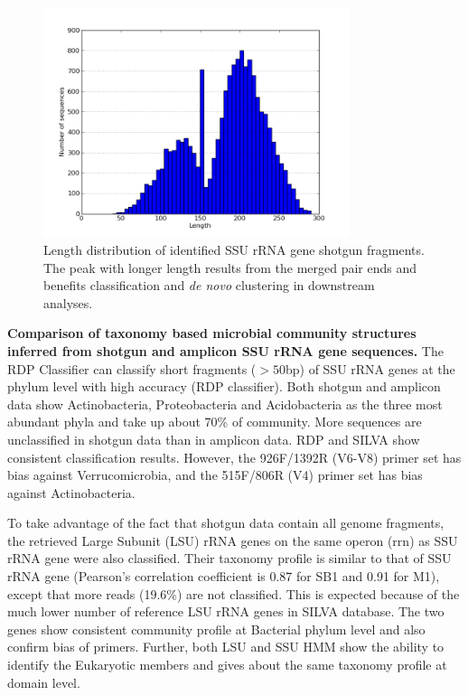 \documentclass[12pt]{article}
\begin{document}
    \begin{figure}[tbph!]
    \centering
    \includegraphics[width=0.8\textwidth]{figs/read_length_dist.png}

    \caption[Length distribution of identified SSU rRNA gene shotgun
    fragments]{Length distribution of identified SSU rRNA gene shotgun
    fragments. The peak with longer length results from the merged
    pair ends and benefits classification and {\em de novo} clustering
    in downstream analyses.}

    \label{fig:read_length_dist}
    \end{figure}

{\bf Comparison of taxonomy based microbial community structures
inferred from shotgun and amplicon SSU rRNA gene sequences. } The RDP
Classifier can classify short fragments ($>50$bp) of SSU rRNA genes at
the phylum level with high accuracy (RDP classifier). Both shotgun and
amplicon data show Actinobacteria, Proteobacteria and Acidobacteria as
the three most abundant phyla and take up about 70\% of
community. More sequences are unclassified in shotgun data than in
amplicon data. RDP and SILVA show consistent classification
results. However, the 926F/1392R (V6-V8) primer set has bias against
Verrucomicrobia, and the 515F/806R (V4) primer set has bias against
Actinobacteria.

To take advantage of the fact that shotgun data contain all genome
fragments, the retrieved Large Subunit (LSU) rRNA genes on the same
operon (rrn) as SSU rRNA gene were also classified. Their taxonomy
profile is similar to that of SSU rRNA gene (Pearson’s correlation
coefficient is 0.87 for SB1 and 0.91 for M1), except that more reads
(19.6\%) are not classified. This is expected because of the much
lower number of reference LSU rRNA genes in SILVA database. The two
genes show consistent community profile at Bacterial phylum level and
also confirm bias of primers. Further, both LSU and SSU HMM show the
ability to identify the Eukaryotic members and gives about the same
taxonomy profile at domain level.
\end{document}
